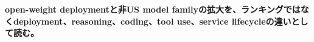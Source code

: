 \noindent\textbf{open-weight deploymentと非US model familyの拡大を、ランキングではなくdeployment、reasoning、coding、tool use、service lifecycleの違いとして読む。}\autocite{src-12865e8612c7,src-1c46fdf17c79}
